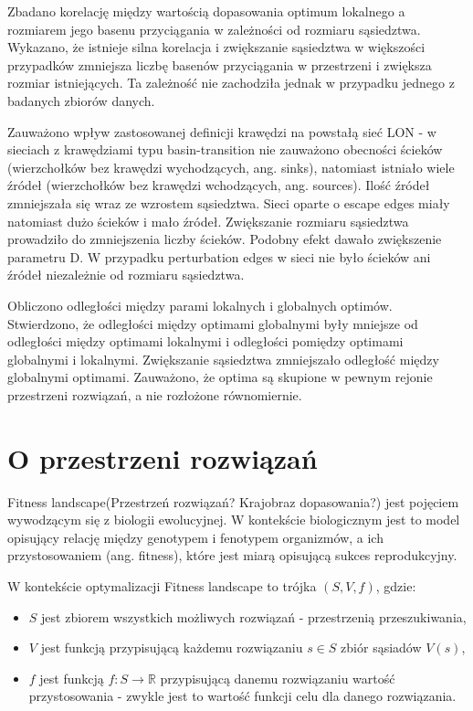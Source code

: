 Zbadano korelację między wartością dopasowania optimum lokalnego a rozmiarem jego basenu przyciągania w zależności
od rozmiaru sąsiedztwa. Wykazano, że istnieje silna korelacja i zwiększanie sąsiedztwa w większości przypadków zmniejsza liczbę
basenów przyciągania w przestrzeni i zwiększa rozmiar istniejących.
Ta zależność nie zachodziła jednak w przypadku jednego z badanych zbiorów danych.

Zauważono wpływ zastosowanej definicji krawędzi na powstałą sieć LON - w sieciach z krawędziami typu
basin-transition nie zauważono obecności ścieków (wierzchołków bez krawędzi wychodzących, ang. sinks),
natomiast istniało wiele źródeł (wierzchołków bez krawędzi wchodzących, ang. sources).
Ilość źródeł zmniejszała się wraz ze wzrostem sąsiedztwa.
Sieci oparte o escape edges miały natomiast dużo ścieków i mało źródeł.
Zwiększanie rozmiaru sąsiedztwa prowadziło do zmniejszenia liczby ścieków.
Podobny efekt dawało zwiększenie parametru D.
W przypadku perturbation edges w sieci nie było ścieków ani źródeł niezależnie od rozmiaru sąsiedztwa.

Obliczono odległości między parami lokalnych i globalnych optimów.
Stwierdzono, że odległości między optimami globalnymi były mniejsze od odległości między optimami lokalnymi
i odległości pomiędzy optimami globalnymi i lokalnymi.
Zwiększanie sąsiedztwa zmniejszało odległość między globalnymi optimami.
Zauważono, że optima są skupione w pewnym rejonie przestrzeni rozwiązań, a nie rozłożone równomiernie.


\section{O przestrzeni rozwiązań}
Fitness landscape(Przestrzeń rozwiązań? Krajobraz dopasowania?) jest pojęciem wywodzącym się z biologii ewolucyjnej.
W kontekście biologicznym jest to model opisujący relację między genotypem i fenotypem organizmów, a ich przystosowaniem (ang. fitness),
które jest miarą opisującą sukces reprodukcyjny\cite{FRAGATA201969}.

W kontekście optymalizacji Fitness landscape to trójka $(S, V, f)$, gdzie:
\begin{itemize}
      \item $S$ jest zbiorem wszystkich możliwych rozwiązań - przestrzenią przeszukiwania,
      \item $V$ jest funkcją przypisującą każdemu rozwiązaniu $s\in{S}$ zbiór sąsiadów $V(s)$,
      \item $f$ jest funkcją $f:S \rightarrow \mathbb{R}$ przypisującą danemu rozwiązaniu wartość przystosowania
            - zwykle jest to wartość funkcji celu dla danego rozwiązania.
\end{itemize}

